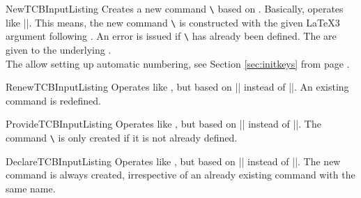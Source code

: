 \begin{docCommand}{NewTCBInputListing}{}
  Creates a new command \texttt{\textbackslash} based on .
  Basically,  operates like |\NewDocumentCommand|. This means,
  the new command \texttt{\textbackslash} is constructed with the
  given \LaTeX3 argument  following \cite{latexproject:usrguide}.
  An error is issued if \texttt{\textbackslash} has already been defined.
  The  are given to the underlying .\\
  The  allow setting up automatic numbering,
  see Section \ref{sec:initkeys} from page \pageref{sec:initkeys}.

\begin{dispExample}

\end{dispExample}
  \end{docCommand}

\begin{docCommand}{RenewTCBInputListing}{}
  Operates like , but based on |\RenewDocumentCommand| instead of |\NewDocumentCommand|.
  An existing command is redefined.
\end{docCommand}

\begin{docCommand}{ProvideTCBInputListing}{}
  Operates like , but based on |\ProvideDocumentCommand| instead of |\NewDocumentCommand|.
  The command \texttt{\textbackslash} is only created if it is not already defined.
\end{docCommand}

\begin{docCommand}{DeclareTCBInputListing}{}
  Operates like , but based on |\DeclareDocumentCommand| instead of |\NewDocumentCommand|.
  The new command is always created, irrespective of an already existing
  command with the same name.
\end{docCommand}



